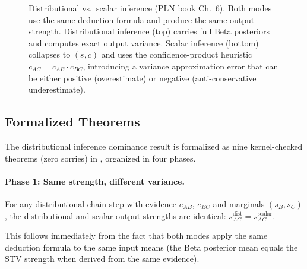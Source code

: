 \documentclass[11pt,openany]{report}
\begin{document}
\begin{figure}[htbp]
\caption{Distributional vs.\ scalar inference (PLN book Ch.~6).  Both modes
use the same deduction formula and produce the same output strength.
Distributional inference (top) carries full Beta posteriors and computes
exact output variance.  Scalar inference (bottom) collapses to $(s, c)$ and
uses the confidence-product heuristic $c_{AC} = c_{AB} \cdot c_{BC}$,
introducing a variance approximation error that can be either positive
(overestimate) or negative (anti-conservative underestimate).}
\label{fig:distributional-vs-scalar}
\end{figure}

\subsection*{Formalized Theorems}

The distributional inference dominance result is formalized as nine
kernel-checked theorems (zero sorries) in
, organized
in four phases.

\paragraph{Phase 1: Same strength, different variance.}
\begin{theorem}
\label{thm:same-strength-one-step}
For any distributional chain step with evidence $e_{AB}$, $e_{BC}$ and
marginals $(s_B, s_C)$, the distributional and scalar output strengths
are identical:
$s^{\mathrm{dist}}_{AC} = s^{\mathrm{scalar}}_{AC}$.
\end{theorem}
This follows immediately from the fact that both modes apply the same
deduction formula to the same input means (the Beta posterior mean equals
the STV strength when derived from the same evidence).
\end{document}
